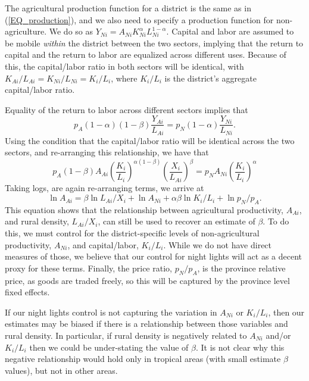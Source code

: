 \documentclass[11pt]{article}
\begin{document}
The agricultural production function for a district is the same as in (\ref{EQ_production}), and we also need to specify a production function for non-agriculture. We do so as $Y_{Ni} = A_{Ni} K_{Ni}^{\alpha} L_{Ni}^{1-\alpha}$. Capital and labor are assumed to be mobile \textit{within} the district between the two sectors, implying that the return to capital and the return to labor are equalized across different uses. Because of this, the capital/labor ratio in both sectors will be identical, with $K_{Ai}/L_{Ai} = K_{Ni}/L_{Ni} = K_i/L_i$, where $K_i/L_i$ is the district's aggregate capital/labor ratio. 

Equality of the return to labor across different sectors implies that 
\begin{equation}
	p_A (1-\alpha)(1-\beta)\frac{Y_{Ai}}{L_{Ai}} = p_N (1-\alpha)\frac{Y_{Ni}}{L_{Ni}}. \nonumber
\end{equation}
Using the condition that the capital/labor ratio will be identical across the two sectors, and re-arranging this relationship, we have that
\begin{equation}
    p_A (1-\beta) A_{Ai} \left(\frac{K_i}{L_i}\right)^{\alpha(1-\beta)} \left(\frac{X_i}{L_{Ai}}\right)^{\beta} = p_N A_{Ni} \left(\frac{K_i}{L_i}\right)^{\alpha} \nonumber
\end{equation}
Taking logs, are again re-arranging terms, we arrive at
\begin{equation}
	\ln A_{Ai} = \beta \ln L_{Ai}/X_i + \ln A_{Ni} + \alpha\beta \ln K_i/L_i + \ln p_N/p_A. \nonumber
\end{equation}
This equation shows that the relationship between agricultural productivity, $A_{Ai}$, and rural density, $L_{Ai}/X_i$, can still be used to recover an estimate of $\beta$. To do this, we must control for the district-specific levels of non-agricultural productivity, $A_{Ni}$, and capital/labor, $K_i/L_i$. While we do not have direct measures of those, we believe that our control for night lights will act as a decent proxy for these terms. Finally, the price ratio, $p_N/p_A$, is the province relative price, as goods are traded freely, so this will be captured by the province level fixed effects.

If our night lights control is not capturing the variation in $A_{Ni}$ or $K_i/L_i$, then our estimates may be biased if there is a relationship between those variables and rural density. In particular, if rural density is negatively related to $A_{Ni}$ and/or $K_i/L_i$ then we could be under-stating the value of $\beta$. It is not clear why this negative relationship would hold only in tropical areas (with small estimate $\beta$ values), but not in other areas.
\end{document}

